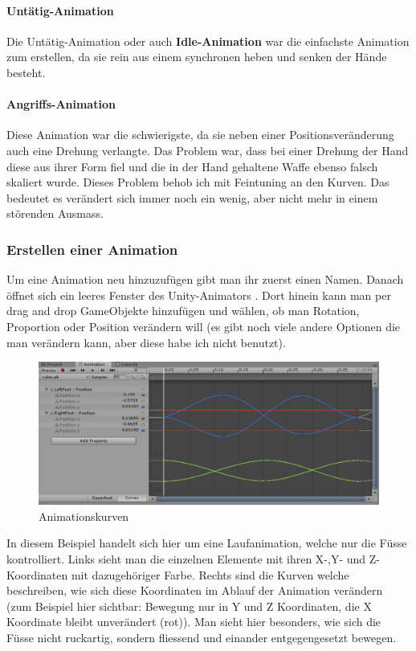 \paragraph{Untätig-Animation}
Die Untätig-Animation oder auch \textbf{Idle-Animation} war die einfachste Animation zum erstellen, da sie rein aus einem synchronen heben und senken der Hände besteht.

\paragraph{Angriffs-Animation}

Diese Animation war die schwierigste, da sie neben einer Positionsveränderung auch eine Drehung verlangte.
Das Problem war, dass bei einer Drehung der Hand diese aus ihrer Form fiel und die in der Hand gehaltene Waffe ebenso falsch skaliert wurde.
Dieses Problem behob ich mit Feintuning an den Kurven.
Das bedeutet es verändert sich immer noch ein wenig, aber nicht mehr in einem störenden Ausmass.

\subsubsection{Erstellen einer Animation}
Um eine Animation neu hinzuzufügen gibt man ihr zuerst einen Namen.
Danach öffnet sich ein leeres Fenster des Unity-Animators 
.
Dort hinein kann man per drag and drop GameObjekte hinzufügen und wählen, ob man Rotation, Proportion oder Position verändern will (es gibt noch viele andere Optionen die man verändern 
kann, aber diese habe ich nicht benutzt).

\begin{figure}[H]
\includegraphics[scale=0.7]{screenshots/animations.png}
\caption{Animationskurven}
\end{figure}

In diesem Beispiel handelt sich hier um eine Laufanimation, welche nur die Füsse kontrolliert. Links sieht man die einzelnen Elemente mit ihren X-,Y- und Z-Koordinaten mit dazugehöriger Farbe. Rechts sind die Kurven welche beschreiben, wie sich diese Koordinaten im Ablauf der Animation verändern (zum Beispiel hier sichtbar: Bewegung nur in Y und Z Koordinaten, die X Koordinate bleibt unverändert (rot)).
Man sieht hier besonders, wie sich die Füsse nicht ruckartig, sondern fliessend und einander entgegengesetzt bewegen.

